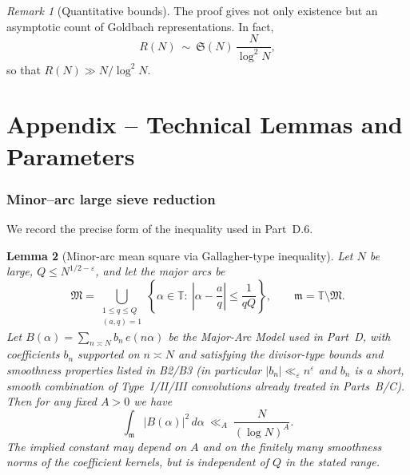 \documentclass[11pt]{article}
\newtheorem{lemma}{Lemma}[part]
\theoremstyle{definition}
\theoremstyle{remark}
\newtheorem{remark}[lemma]{Remark}
\numberwithin{equation}{part}
\begin{document}
\begin{remark}[Quantitative bounds]
	The proof gives not only existence but an asymptotic count of Goldbach representations.
	In fact,
	\[
		R(N)\ \sim\ \mathfrak S(N)\,\frac{N}{\log^2 N},
	\]
	so that $R(N)\gg N/\log^2 N$.
\end{remark}


\part{Appendix -- Technical Lemmas and Parameters}

\section{Minor--arc large sieve reduction}

We record the precise form of the inequality used in Part~D.6.

\begin{lemma}[Minor-arc mean square via Gallagher-type inequality]
	\label{lem:minor-L2-gallagher}
	Let $N$ be large, $Q\le N^{1/2-\varepsilon}$, and let the major arcs be
	\[
		\mathfrak M=\bigcup_{\substack{1\le q\le Q\\(a,q)=1}}
		\left\{\alpha\in\mathbb T:\ \left|\alpha-\frac{a}{q}\right|\le \frac{1}{qQ}\right\},
		\qquad \mathfrak m=\mathbb T\setminus \mathfrak M.
	\]
	Let $B(\alpha)=\sum_{n\asymp N} b_n\,e(n\alpha)$ be the Major-Arc Model used in Part~D, with coefficients $b_n$ supported on $n\asymp N$ and satisfying the divisor-type bounds and smoothness properties listed in \textup{B2/B3} (in particular $|b_n|\ll_\varepsilon n^\varepsilon$ and $b_n$ is a short, smooth combination of Type~I/II/III convolutions already treated in Parts~B/C).
	Then for any fixed $A>0$ we have
	\begin{equation}\label{eq:minor-L2-B}
		\int_{\mathfrak m}\!|B(\alpha)|^2\,d\alpha \ \ll_A\ \frac{N}{(\log N)^A}.
	\end{equation}
	The implied constant may depend on $A$ and on the finitely many smoothness norms of the coefficient kernels, but is independent of $Q$ in the stated range.
\end{lemma}
\end{document}
